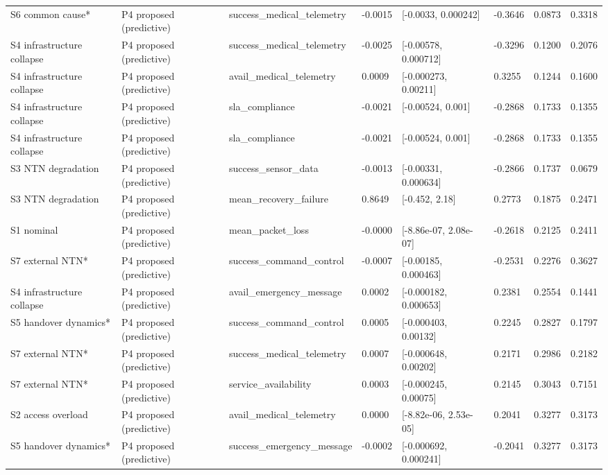 \begin{tabular}{llllllll}
S6 common cause* & P4 proposed (predictive) & success\_medical\_telemetry & -0.0015 & [-0.0033, 0.000242] & -0.3646 & 0.0873 & 0.3318 \\
S4 infrastructure collapse & P4 proposed (predictive) & success\_medical\_telemetry & -0.0025 & [-0.00578, 0.000712] & -0.3296 & 0.1200 & 0.2076 \\
S4 infrastructure collapse & P4 proposed (predictive) & avail\_medical\_telemetry & 0.0009 & [-0.000273, 0.00211] & 0.3255 & 0.1244 & 0.1600 \\
S4 infrastructure collapse & P4 proposed (predictive) & sla\_compliance & -0.0021 & [-0.00524, 0.001] & -0.2868 & 0.1733 & 0.1355 \\
S4 infrastructure collapse & P4 proposed (predictive) & sla\_compliance & -0.0021 & [-0.00524, 0.001] & -0.2868 & 0.1733 & 0.1355 \\
S3 NTN degradation & P4 proposed (predictive) & success\_sensor\_data & -0.0013 & [-0.00331, 0.000634] & -0.2866 & 0.1737 & 0.0679 \\
S3 NTN degradation & P4 proposed (predictive) & mean\_recovery\_failure & 0.8649 & [-0.452, 2.18] & 0.2773 & 0.1875 & 0.2471 \\
S1 nominal & P4 proposed (predictive) & mean\_packet\_loss & -0.0000 & [-8.86e-07, 2.08e-07] & -0.2618 & 0.2125 & 0.2411 \\
S7 external NTN* & P4 proposed (predictive) & success\_command\_control & -0.0007 & [-0.00185, 0.000463] & -0.2531 & 0.2276 & 0.3627 \\
S4 infrastructure collapse & P4 proposed (predictive) & avail\_emergency\_message & 0.0002 & [-0.000182, 0.000653] & 0.2381 & 0.2554 & 0.1441 \\
S5 handover dynamics* & P4 proposed (predictive) & success\_command\_control & 0.0005 & [-0.000403, 0.00132] & 0.2245 & 0.2827 & 0.1797 \\
S7 external NTN* & P4 proposed (predictive) & success\_medical\_telemetry & 0.0007 & [-0.000648, 0.00202] & 0.2171 & 0.2986 & 0.2182 \\
S7 external NTN* & P4 proposed (predictive) & service\_availability & 0.0003 & [-0.000245, 0.00075] & 0.2145 & 0.3043 & 0.7151 \\
S2 access overload & P4 proposed (predictive) & avail\_medical\_telemetry & 0.0000 & [-8.82e-06, 2.53e-05] & 0.2041 & 0.3277 & 0.3173 \\
S5 handover dynamics* & P4 proposed (predictive) & success\_emergency\_message & -0.0002 & [-0.000692, 0.000241] & -0.2041 & 0.3277 & 0.3173 \\

\end{tabular}
